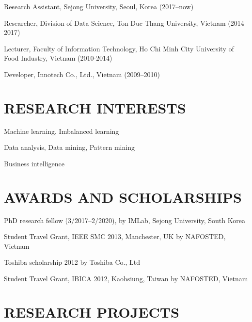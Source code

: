 \documentclass[letterpaper]{article}
\renewenvironment{itemize}{
  \begin{list}{}{
    \setlength{\leftmargin}{1.5em}
  }
}{
  \end{list}
}
\begin{document}
\begin{itemize}

\item Research Assistant, Sejong University, Seoul, Korea (2017--now)
\item Researcher, Division of Data Science, Ton Duc Thang University, Vietnam (2014--2017)
\item Lecturer, Faculty of Information Technology, Ho Chi Minh City University of Food Industry, Vietnam (2010-2014)
\item Developer, Innotech Co., Ltd., Vietnam (2009--2010)
\end{itemize}

\section*{RESEARCH INTERESTS}

\begin{itemize}

\item Machine learning, Imbalanced learning
\item Data analysis, Data mining, Pattern mining 
\item Business intelligence

\end{itemize}


\section*{AWARDS AND SCHOLARSHIPS}

\begin{itemize}

\item PhD research fellow (3/2017--2/2020), by IMLab, Sejong University, South Korea 
\item Student Travel Grant, IEEE SMC 2013, Manchester, UK  by NAFOSTED, Vietnam
\item Toshiba scholarship 2012 by Toshiba Co., Ltd
\item Student Travel Grant, IBICA 2012, Kaohsiung, Taiwan by NAFOSTED, Vietnam

\end{itemize}

\section*{RESEARCH PROJECTS}
\end{document}
